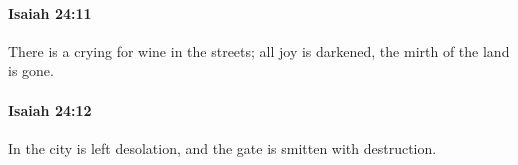 		\paragraph{Isaiah 24:11} %
			\label{ISAIAH-24-11}

			There is a crying for wine in the streets; all joy is darkened, the mirth of the land is gone.


		\paragraph{Isaiah 24:12} %
			\label{ISAIAH-24-12}

			In the city is left desolation, and the gate is smitten with destruction.


